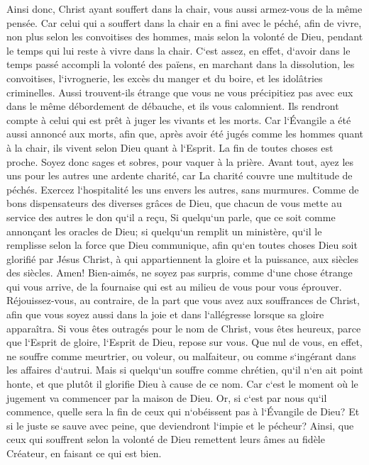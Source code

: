 \verse Ainsi donc, Christ ayant souffert dans la chair, vous aussi armez-vous de la même pensée. Car celui qui a souffert dans la chair en a fini avec le péché, 
\verse afin de vivre, non plus selon les convoitises des hommes, mais selon la volonté de Dieu, pendant le temps qui lui reste à vivre dans la chair. 
\verse C`est assez, en effet, d`avoir dans le temps passé accompli la volonté des païens, en marchant dans la dissolution, les convoitises, l`ivrognerie, les excès du manger et du boire, et les idolâtries criminelles. 
\verse Aussi trouvent-ils étrange que vous ne vous précipitiez pas avec eux dans le même débordement de débauche, et ils vous calomnient. 
\verse Ils rendront compte à celui qui est prêt à juger les vivants et les morts. 
\verse Car l`Évangile a été aussi annoncé aux morts, afin que, après avoir été jugés comme les hommes quant à la chair, ils vivent selon Dieu quant à l`Esprit. 
\verse La fin de toutes choses est proche. Soyez donc sages et sobres, pour vaquer à la prière. 
\verse Avant tout, ayez les uns pour les autres une ardente charité, car La charité couvre une multitude de péchés. 
\verse Exercez l`hospitalité les uns envers les autres, sans murmures. 
\verse Comme de bons dispensateurs des diverses grâces de Dieu, que chacun de vous mette au service des autres le don qu`il a reçu, 
\verse Si quelqu`un parle, que ce soit comme annonçant les oracles de Dieu; si quelqu`un remplit un ministère, qu`il le remplisse selon la force que Dieu communique, afin qu`en toutes choses Dieu soit glorifié par Jésus Christ, à qui appartiennent la gloire et la puissance, aux siècles des siècles. Amen! 
\verse Bien-aimés, ne soyez pas surpris, comme d`une chose étrange qui vous arrive, de la fournaise qui est au milieu de vous pour vous éprouver. 
\verse Réjouissez-vous, au contraire, de la part que vous avez aux souffrances de Christ, afin que vous soyez aussi dans la joie et dans l`allégresse lorsque sa gloire apparaîtra. 
\verse Si vous êtes outragés pour le nom de Christ, vous êtes heureux, parce que l`Esprit de gloire, l`Esprit de Dieu, repose sur vous. 
\verse Que nul de vous, en effet, ne souffre comme meurtrier, ou voleur, ou malfaiteur, ou comme s`ingérant dans les affaires d`autrui. 
\verse Mais si quelqu`un souffre comme chrétien, qu`il n`en ait point honte, et que plutôt il glorifie Dieu à cause de ce nom. 
\verse Car c`est le moment où le jugement va commencer par la maison de Dieu. Or, si c`est par nous qu`il commence, quelle sera la fin de ceux qui n`obéissent pas à l`Évangile de Dieu? 
\verse Et si le juste se sauve avec peine, que deviendront l`impie et le pécheur? 
\verse Ainsi, que ceux qui souffrent selon la volonté de Dieu remettent leurs âmes au fidèle Créateur, en faisant ce qui est bien. 

